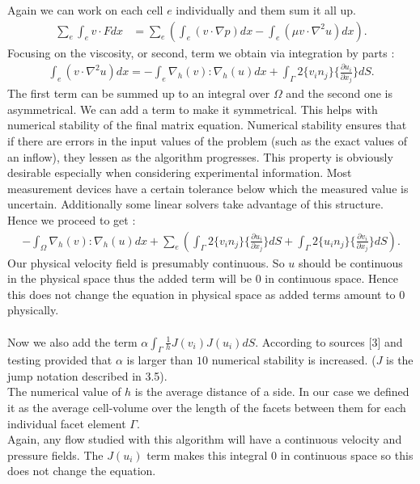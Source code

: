 \documentclass[11pt,twoside,a4paper]{article}
\begin{document}
Again we can work on each cell $e$ individually and them sum it all up.
\begin{align*}
\sum_e \int_e v \cdot F dx &= \sum_e (\int_e (v \cdot \nabla p) dx - \int_e (\mu v \cdot \nabla^2 u) dx) .
\end{align*}
Focusing on the viscosity, or second, term we obtain via integration by parts :
\begin{align*}
\int_e (v \cdot \nabla^2 u) dx = - \int_e \nabla_h(v) : \nabla_h(u) dx + \int_\Gamma 2 \{ v_i n_j \} \{ \frac{\partial u_i}{\partial x_j}\} dS .
\end{align*}
The first term can be summed up to an integral over $\Omega$ and the second one is asymmetrical. We can add a term to make it symmetrical. This helps with numerical stability of the final matrix equation. Numerical stability ensures that if there are errors in the input values of the problem (such as the exact values of an inflow), they lessen as the algorithm progresses. This property is obviously desirable especially when considering experimental information. Most measurement devices have a certain tolerance below which the measured value is uncertain. Additionally some linear solvers take advantage of this structure.\\
Hence we proceed to get :
\begin{align*}
-  \int_\Omega \nabla_h(v) : \nabla_h(u) dx + \sum_e( \int_\Gamma 2 \{ v_i n_j \} \{ \frac{\partial u_i}{\partial x_j}\} dS + \int_\Gamma 2 \{ u_i n_j \} \{ \frac{\partial v_i}{\partial x_j}\} dS) .
\end{align*}
Our physical velocity field is presumably continuous.
So $u$ should be continuous in the physical space thus the added term will be $0$ in continuous space. Hence this does not change the equation in physical space as added terms amount to $0$ physically.\\
\\
Now we also add the term $\alpha \int_\Gamma \frac{1}{h}  J(v_i) J(u_i) dS$. According to sources [3] and testing provided that  $\alpha$ is larger than $10$ numerical stability is increased.
($J$ is the jump notation described in 3.5).\\
The numerical value of $h$ is the average distance of a side. In our case we defined it as the average cell-volume over the length of the facets between them for each individual facet element $\Gamma$.\\
Again, any flow studied with this algorithm will have a continuous velocity and pressure fields. The $J(u_i)$ term makes this integral $0$ in continuous space so this does not change the equation.\\
\end{document}

